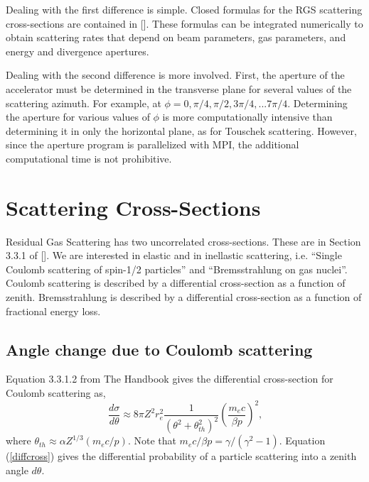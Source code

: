 \documentclass[a4paper,10pt]{article}
\begin{document}
Dealing with the first difference is simple.  Closed formulas for the RGS scattering cross-sections are contained in [\cite{hb}].  These formulas can be integrated numerically to obtain scattering rates that depend on beam parameters, gas parameters, and energy and divergence apertures.

Dealing with the second difference is more involved.  First, the aperture of the accelerator must be determined in the transverse plane for several values of the scattering azimuth.  For example, at $\phi = 0, \pi/4, \pi/2, 3\pi/4, ... 7\pi/4$.  Determining the aperture for various values of $\phi$ is more computationally intensive than determining it in only the horizontal plane, as for Touschek scattering.  However, since the aperture program is parallelized with MPI, the additional computational time is not prohibitive.

\section{Scattering Cross-Sections}

Residual Gas Scattering has two uncorrelated cross-sections.  These are in Section 3.3.1 of [\cite{hb}].  We are interested in elastic and
in inellastic scattering, i.e.  ``Single Coulomb scattering of spin-1/2 particles'' and ``Bremsstrahlung on gas nuclei''.
Coulomb scattering is described by a differential cross-section as a function of zenith.  Bremsstrahlung is described by a 
differential cross-section as a function of fractional energy loss.

\subsection{Angle change due to Coulomb scattering}

Equation 3.3.1.2 from The Handbook gives the differential cross-section for Coulomb scattering as,
\begin{equation}
\frac{d\sigma}{d\theta}\approx 8\pi Z^2 r_e^2 \frac{1}{\left(\theta^2+\theta_{th}^2\right)^2}\left(\frac{m_e c}{\beta p}\right)^2\textrm{,}
\label{diffcross}
\end{equation}
where $\theta_{th}\approx\alpha Z^{1/3}\left(m_e c/p\right)$.  Note that $m_e c/\beta p = \gamma/(\gamma^2-1)$.  Equation (\ref{diffcross}) gives the
differential probability of a particle scattering into a zenith angle $d\theta$.
\end{document}
